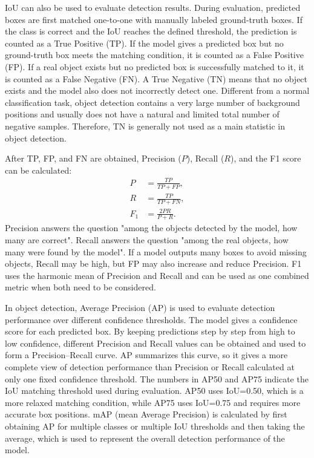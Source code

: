 IoU can also be used to evaluate detection results. During evaluation, predicted boxes are first matched one-to-one with manually labeled ground-truth boxes. If the class is correct and the IoU reaches the defined threshold, the prediction is counted as a True Positive (TP). If the model gives a predicted box but no ground-truth box meets the matching condition, it is counted as a False Positive (FP). If a real object exists but no predicted box is successfully matched to it, it is counted as a False Negative (FN). A True Negative (TN) means that no object exists and the model also does not incorrectly detect one. Different from a normal classification task, object detection contains a very large number of background positions and usually does not have a natural and limited total number of negative samples. Therefore, TN is generally not used as a main statistic in object detection.

After TP, FP, and FN are obtained, Precision ($P$), Recall ($R$), and the F1 score can be calculated:
\begin{align}
P &= \frac{TP}{TP+FP},\\
R &= \frac{TP}{TP+FN},\\
F_1 &= \frac{2PR}{P+R}.
\end{align}
Precision answers the question "among the objects detected by the model, how many are correct". Recall answers the question "among the real objects, how many were found by the model". If a model outputs many boxes to avoid missing objects, Recall may be high, but FP may also increase and reduce Precision. F1 uses the harmonic mean of Precision and Recall and can be used as one combined metric when both need to be considered.

In object detection, Average Precision (AP) is used to evaluate detection performance over different confidence thresholds. The model gives a confidence score for each predicted box. By keeping predictions step by step from high to low confidence, different Precision and Recall values can be obtained and used to form a Precision--Recall curve. AP summarizes this curve, so it gives a more complete view of detection performance than Precision or Recall calculated at only one fixed confidence threshold. The numbers in AP50 and AP75 indicate the IoU matching threshold used during evaluation. AP50 uses IoU=0.50, which is a more relaxed matching condition, while AP75 uses IoU=0.75 and requires more accurate box positions. mAP (mean Average Precision) is calculated by first obtaining AP for multiple classes or multiple IoU thresholds and then taking the average, which is used to represent the overall detection performance of the model.

